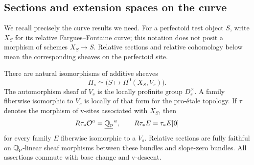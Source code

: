 \subsection{Sections and extension spaces on the curve}

We recall precisely the curve results we need.  For a perfectoid
test object $S$, write $X_S$ for its relative Fargues--Fontaine
curve; this notation does not posit a morphism of schemes
$X_S\to S$.  Relative sections and relative cohomology below mean
the corresponding sheaves on the perfectoid site.

\begin{lemma}\label{h3:geom:curve-inputs}
There are natural isomorphisms of additive sheaves
\[
 H_s\simeq\bigl(S\longmapsto H^0(X_S,V_s)\bigr).
\]
The automorphism sheaf of $V_s$ is the locally profinite group
$D_s^{\times}$.  A family fiberwise isomorphic to $V_s$ is locally
of that form for the pro-\'etale topology.  If $\tau$ denotes
the morphism of v-sites associated with $X_S$, then
\[
 R\tau_*\mathcal O^a=\underline{\mathbb Q_p}^{\,a},\qquad
 R\tau_*E=\tau_*E[0]
\]
for every family $E$ fiberwise isomorphic to a $V_s$.
Relative sections are fully faithful on $\mathbb Q_p$-linear sheaf
morphisms between these bundles and slope-zero bundles.
All assertions commute with base change and v-descent.
\end{lemma}

